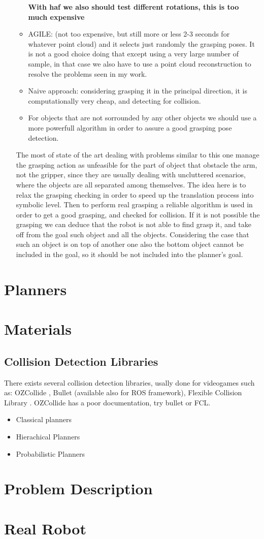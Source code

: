 \begin{itemize}
\begin{itemize}
\textbf{With haf we also should test different rotations, this is too much expensive}
\item AGILE: (not too expensive, but still more or less 2-3 seconds for whatever point cloud) and it selects just randomly the grasping poses. It is not a good choice doing that except using a very large number of sample, in that case we also have to use a point cloud reconstruction to resolve the problems seen in my work. 
\item Naive approach: considering grasping it in the principal direction, it is computationally very cheap, and detecting for collision.
\item For objects that are not sorrounded by any other objects we should use a more powerfull algorithm in order to assure a good grasping pose detection.
\end{itemize} 
The most of state of the art dealing with problems similar to this one manage the grasping action as unfeasible for the part of object that obstacle the arm, not the gripper, since they are usually dealing with uncluttered scenarios, where the objects are all separated among themselves. The idea here is to relax the grasping checking in order to speed up the translation process into symbolic level. Then to perform real grasping a reliable algorithm is used in order to get a good grasping, and checked for collision. If it is not possible the grasping we can deduce that the robot is not able to find grasp it, and take off from the goal such object and all the objects. Considering the case that such an object is on top of another one also the bottom object cannot be included in the goal, so it should be not included into the planner's goal.
\end{itemize}

\section{Planners}

\section{Materials}
\subsection{Collision Detection Libraries}
There exists several collision detection libraries, usally done for videogames such as: OZCollide \citep{OZCollide}, Bullet (available also for ROS framework)\citep{Bullet}, Flexible Collision Library \citep{pan2012fcl}. OZCollide has a poor documentation, try bullet or FCL.

\begin{itemize}
\item Classical planners
\item Hierachical Planners
\item Probabilistic Planners
\end{itemize}

\section{Problem Description}
\section{Real Robot }


